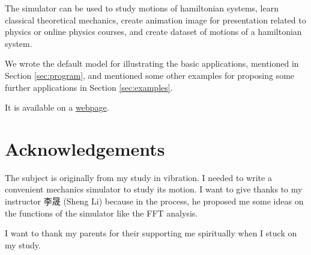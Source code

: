\documentclass[12pt]{article}
\begin{document}
The simulator can be used to study motions of hamiltonian systems,
learn classical theoretical mechanics,
create animation image for presentation related to physics or online physics courses,
and create dataset of motions of a hamiltonian system.

We wrote the default model for illustrating the basic applications, mentioned in Section \ref{sec:program},
and mentioned some other examples for proposing some further applications in Section \ref{sec:examples}.

It is available on a
\href{https://UlyssesZh.github.io/rpg/mechsimul2}{webpage}.

\newpage




\newpage

\section*{Acknowledgements}

The subject is originally from my study in vibration.
I needed to write a convenient mechanics simulator to study its motion.
I want to give thanks to my instructor 李晟 (Sheng Li) because in the process,
he proposed me some ideas on the functions of the simulator
like the FFT analysis.

I want to thank my parents for their supporting me spiritually when I stuck on my study.
\end{document}
